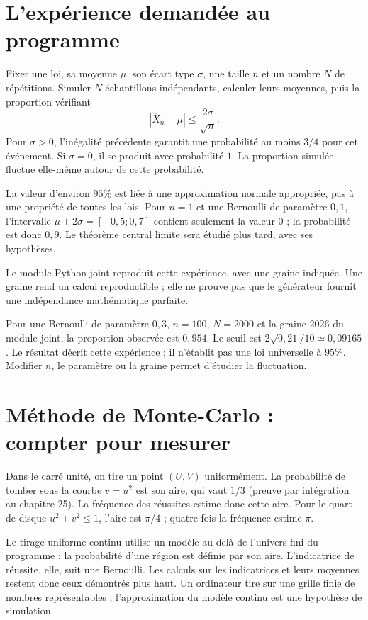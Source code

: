\documentclass[../cours_1re.tex]{subfiles}
\begin{document}
\section{L'expérience demandée au programme}
Fixer une loi, sa moyenne $\mu$, son écart type $\sigma$, une taille $n$
et un nombre $N$ de répétitions. Simuler $N$ échantillons indépendants,
calculer leurs moyennes, puis la proportion vérifiant
\[
|\overline X_n-\mu|\le\frac{2\sigma}{\sqrt n}.
\]
Pour $\sigma>0$, l'inégalité précédente garantit une probabilité au moins
$3/4$ pour cet événement. Si $\sigma=0$, il se produit avec probabilité $1$.
La proportion simulée fluctue elle-même autour de cette probabilité.

\begin{attention}
La valeur d'environ $95\%$ est liée à une approximation normale appropriée,
pas à une propriété de toutes les lois. Pour $n=1$ et une Bernoulli de paramètre
$0{,}1$, l'intervalle $\mu\pm2\sigma=[-0{,}5;0{,}7]$ contient seulement
la valeur $0$ ; la probabilité est donc $0{,}9$.
Le théorème central limite sera étudié plus tard, avec ses hypothèses.
\end{attention}
Le module Python joint reproduit cette expérience, avec une graine indiquée.
Une graine rend un calcul reproductible ; elle ne prouve pas que le
générateur fournit une indépendance mathématique parfaite.
\begin{exemple}
Pour une Bernoulli de paramètre $0{,}3$, $n=100$, $N=2000$ et la graine
$2026$ du module joint, la proportion observée est $0{,}954$.
Le seuil est $2\sqrt{0{,}21}/10\simeq0{,}09165$.
Le résultat décrit cette expérience ; il n'établit pas une loi universelle
à $95\%$. Modifier $n$, le paramètre ou la graine permet d'étudier la fluctuation.
\end{exemple}

\section{Méthode de Monte-Carlo : compter pour mesurer}
Dans le carré unité, on tire un point $(U,V)$ uniformément. La probabilité
de tomber sous la courbe $v=u^2$ est son aire, qui vaut $1/3$
(preuve par intégration au chapitre 25).
La fréquence des réussites estime donc cette aire.
Pour le quart de disque $u^2+v^2\le1$, l'aire est $\pi/4$ ;
quatre fois la fréquence estime $\pi$.

Le tirage uniforme continu utilise un modèle au-delà de l'univers fini
du programme : la probabilité d'une région est définie par son aire.
L'indicatrice de réussite, elle, suit une Bernoulli. Les calculs sur les
indicatrices et leurs moyennes restent donc ceux démontrés plus haut.
Un ordinateur tire sur une grille finie de nombres représentables ;
l'approximation du modèle continu est une hypothèse de simulation.
\end{document}
